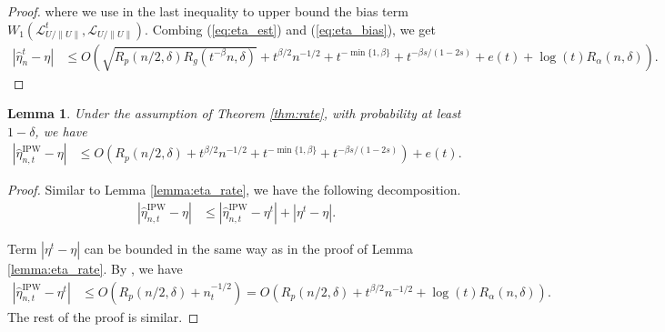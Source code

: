 \documentclass[12pt]{article}
\theoremstyle{plain}
\newtheorem{lemma}[theorem]{Lemma}
\theoremstyle{definition}
\begin{document}
\begin{proof}
  where we use {\citetext{\citealp{zhang2023wasserstein},  Proposition 3.1}}
  in the last inequality to upper bound the bias term $W_1 (\mathcal{L}_{U
  /\|U\|}^t, \mathcal{L}_{U /\|U\|})$. Combing (\ref{eq:eta_est}) and
  (\ref{eq:eta_bias}), we get
  \begin{align*}
    | \hat{\eta}_n^{t} - \eta | & \leqslant O (\sqrt{R_p (n/2, \delta) R_g
    (t^{- \beta} n, \delta)} + t^{\beta / 2} n^{- 1 / 2} + t^{- \min \{1,
    \beta\}} + t^{- \beta s / (1 - 2 s)} + e (t) + \log (t) R_{\alpha} (n,\delta)) .
  \end{align*}
\end{proof}


\begin{lemma}\label{lemma:eta_ipw}
  Under the assumption of Theorem \ref{thm:rate}, with probability at least $1
  - \delta$, we have
\begin{align*}
    | \hat{\eta}_{n, t}^{\text{IPW}} - \eta | & \leqslant O (R_p (n/2, \delta) +
    t^{\beta / 2} n^{- 1 / 2} + t^{- \min \{1, \beta\}} + t^{- \beta s / (1 -
    2 s)}) + e (t) .
  \end{align*}
\end{lemma}
\begin{proof}

Similar to Lemma \ref{lemma:eta_rate}, we have the following decomposition.
\begin{align*}
  | \hat{\eta}_{n, t}^{\text{IPW}} - \eta | & \leqslant | \hat{\eta}_{n,
  t}^{\text{IPW}} - \eta^t | + | \eta^t - \eta |.
\end{align*}

Term $| \eta^t - \eta |$ can be bounded in the same way as in the proof of
Lemma \ref{lemma:eta_rate}. By \cite[Theorem 1]{su2023estimated}, we have
\begin{align*}
  | \hat{\eta}_{n, t}^{\text{IPW}} - \eta^t | & \leqslant O (R_p (n/2, \delta) +
  n_t^{- 1 / 2}) = O (R_p (n/2, \delta) + t^{\beta / 2} n^{- 1 / 2}  + \log (t) R_{\alpha} (n,\delta)) .
\end{align*}
The rest of the proof is similar.   
\end{proof}
\end{document}
